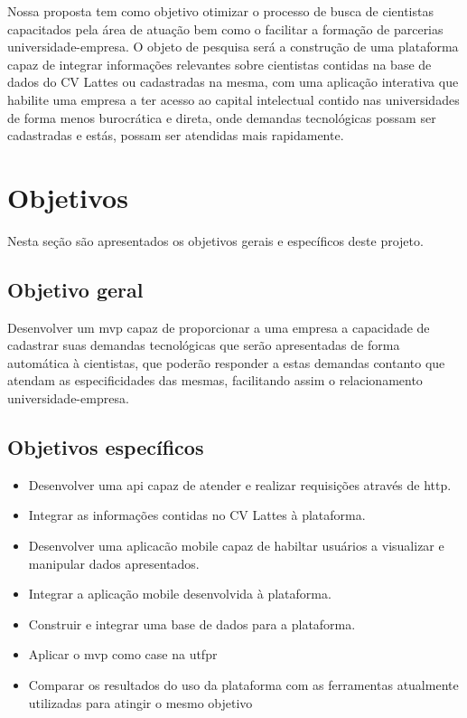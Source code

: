 Nossa proposta tem como objetivo otimizar o processo de busca de cientistas capacitados pela área de atuação bem como o facilitar a formação de parcerias universidade-empresa. O objeto de pesquisa será a construção de uma plataforma capaz de integrar informações relevantes sobre cientistas contidas na base de dados do CV Lattes ou cadastradas na mesma, com uma aplicação interativa que habilite uma empresa a ter acesso ao capital intelectual contido nas universidades de forma menos burocrática e direta, onde demandas tecnológicas possam ser cadastradas e estás, possam ser atendidas mais rapidamente.

\section{Objetivos}\label{sec:objetivos}

Nesta seção são apresentados os objetivos gerais e específicos deste projeto.

\subsection{Objetivo geral}\label{subsec:objetivoGeral}

Desenvolver um \gls{mvp} capaz de proporcionar a uma empresa a capacidade de cadastrar suas demandas tecnológicas que serão apresentadas de forma automática à cientistas, que poderão responder a estas demandas contanto que atendam as especificidades das mesmas, facilitando assim o relacionamento universidade-empresa.

\subsection{Objetivos específicos}\label{subsec:objetivosEspecificos}

\begin{itemize}
    \item Desenvolver uma \gls{api} capaz de atender e realizar requisições através de \gls{http}.
    \item Integrar as informações contidas no CV Lattes à plataforma.
    \item Desenvolver uma aplicacão mobile capaz de habiltar usuários a visualizar e manipular dados apresentados.
    \item Integrar a aplicação mobile desenvolvida à plataforma.
    \item Construir e integrar uma base de dados para a plataforma.
    \item Aplicar o \gls{mvp} como case na \gls{utfpr}
    \item Comparar os resultados do uso da plataforma com as ferramentas atualmente utilizadas para atingir o mesmo objetivo
\end{itemize}

